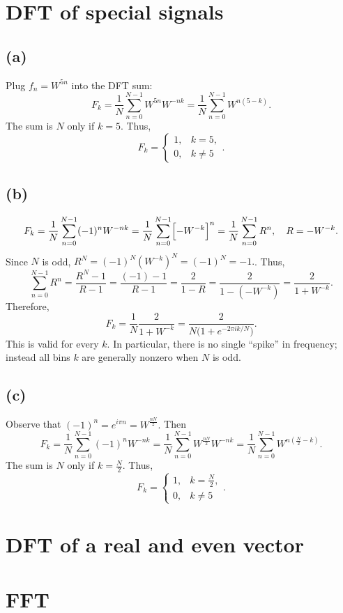 \documentclass{article}
\begin{document}
\newpage
\section{DFT of special signals}
\subsection*{(a)}
Plug $f_n = W^{5n}$ into the DFT sum:
$$
    F_k
    =\frac{1}{N}\sum_{n=0}^{N-1} W^{5n}W^{-nk}
    =\frac{1}{N}\sum_{n=0}^{N-1} W^{n(5-k)}.
$$
The sum is $N$ only if $k=5$. Thus,
$$
    \boxed{
        F_k
        =
        \begin{cases}
            1, & k=5,    \\
            0, & k\neq 5
        \end{cases}
    }.
$$

\subsection*{(b)}
$$
    F_k
    =\frac1N\sum_{n=0}^{N-1}
    (-1)^nW^{-nk}
    =\frac1N\sum_{n=0}^{N-1}
    \Bigl[-W^{-k}\Bigr]^{n}
    =\frac1N\sum_{n=0}^{N-1}R^n,
    \quad
    R = -W^{-k}.
$$
Since $N$ is odd, $R^N=(-1)^N(W^{-k})^N=(-1)^N=-1.$. Thus,
$$
    \sum_{n=0}^{N-1}R^n
    =\frac{R^N-1}{R-1}
    =\frac{(-1)-1}{R-1}
    =\frac{2}{1-R}
    =\frac{2}{1-(-W^{-k})}
    =\frac{2}{1+W^{-k}}.
$$
Therefore,
$$
    \boxed{
    F_k
    = \frac{1}{N}\frac{2}{1+W^{-k}}
    =\frac{2}{N\bigl(1 + e^{-2\pi i k/N}\bigr)}
    }.
$$
This is valid for every $k$.  In particular, there is no single “spike” in frequency; instead all bins $k$ are generally nonzero when $N$ is odd.

\subsection*{(c)}
Observe that $(-1)^n = e^{i\pi n} = W^{\frac{nN}{2}}.$  Then
$$
    F_k
    =\frac1N\sum_{n=0}^{N-1}
    (-1)^nW^{-nk}
    =\frac1N\sum_{n=0}^{N-1} W^{\frac{nN}{2}}W^{-nk}
    =\frac1N\sum_{n=0}^{N-1} W^{n\left(\frac{N}{2}-k\right)}.
$$
The sum is $N$ only if $k=\frac{N}{2}$. Thus,
$$
    \boxed{
        F_k
        =
        \begin{cases}
            1, & k=\frac{N}{2}, \\
            0, & k\neq 5
        \end{cases}
    }.
$$

\newpage
\section{DFT of a real and even vector}

\newpage
\section{FFT}
\end{document}
